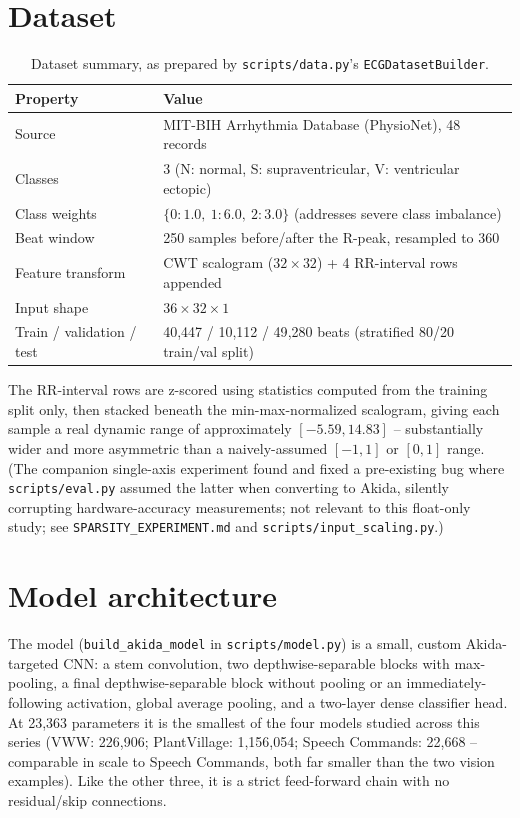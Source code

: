 \documentclass[11pt]{article}
\newcommand{\code}[1]{\texttt{#1}}
\begin{document}
\section{Dataset}

\begin{table}[H]
\centering
\caption{Dataset summary, as prepared by \code{scripts/data.py}'s \code{ECGDatasetBuilder}.}
\label{tab:dataset}
\begin{tabular}{@{}ll@{}}
\toprule
Property & Value \\
\midrule
Source & MIT-BIH Arrhythmia Database (PhysioNet), 48 records \\
Classes & 3 (N: normal, S: supraventricular, V: ventricular ectopic) \\
Class weights & $\{0: 1.0,\ 1: 6.0,\ 2: 3.0\}$ (addresses severe class imbalance) \\
Beat window & 250 samples before/after the R-peak, resampled to 360 \\
Feature transform & CWT scalogram ($32{\times}32$) + 4 RR-interval rows appended \\
Input shape & $36 \times 32 \times 1$ \\
Train / validation / test & 40{,}447 / 10{,}112 / 49{,}280 beats (stratified 80/20 train/val split) \\
\bottomrule
\end{tabular}
\end{table}

The RR-interval rows are z-scored using statistics computed from the training split only, then stacked beneath the min-max-normalized scalogram, giving each sample a real dynamic range of approximately $[-5.59, 14.83]$ -- substantially wider and more asymmetric than a naively-assumed $[-1, 1]$ or $[0, 1]$ range. (The companion single-axis experiment found and fixed a pre-existing bug where \code{scripts/eval.py} assumed the latter when converting to Akida, silently corrupting hardware-accuracy measurements; not relevant to this float-only study; see \code{SPARSITY\_EXPERIMENT.md} and \code{scripts/input\_scaling.py}.)

\section{Model architecture}
\label{sec:architecture}

The model (\code{build\_akida\_model} in \code{scripts/model.py}) is a small, custom Akida-targeted CNN: a stem convolution, two depthwise-separable blocks with max-pooling, a final depthwise-separable block without pooling or an immediately-following activation, global average pooling, and a two-layer dense classifier head. At 23,363 parameters it is the smallest of the four models studied across this series (VWW: 226,906; PlantVillage: 1,156,054; Speech Commands: 22,668 -- comparable in scale to Speech Commands, both far smaller than the two vision examples). Like the other three, it is a strict feed-forward chain with no residual/skip connections.
\end{document}
